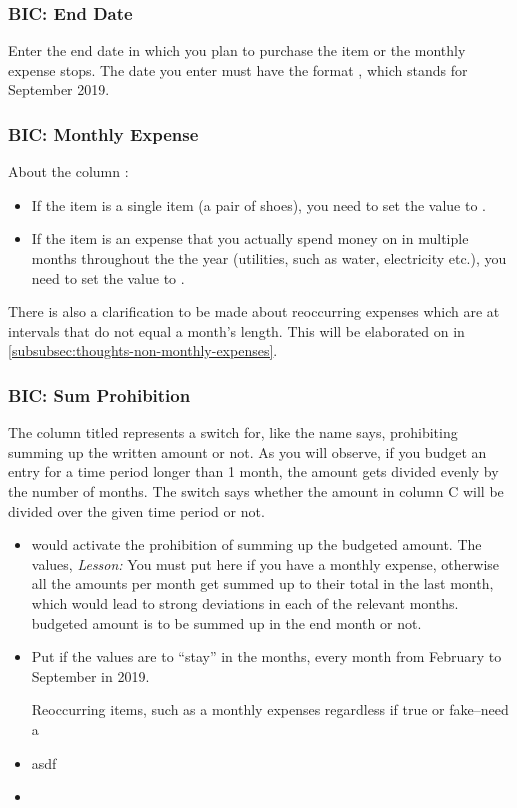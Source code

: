 \subsubsection{BIC: End Date}
\label{subsubsec:budgeting-item-column-end-date}

Enter the end date in which you plan to purchase the item or the monthly expense stops.
The date you enter must have the format , \eg {} which stands for September 2019.

\subsubsection{BIC: Monthly Expense}
\label{subsubsec:budgeting-item-column-monthly-expense}

About the column :
\begin{itemize}
	\item If the item is a single item (\eg a pair of shoes), you need to set the value to .
	\item If the item is an expense that you actually spend money on in multiple months throughout the the year (\eg utilities, such as water, electricity etc.), you need to set the value to .
\end{itemize}

There is also a clarification to be made about reoccurring expenses which are at intervals that do not equal a month's length.
This will be elaborated on in \autoref{subsubsec:thoughts-non-monthly-expenses}.

\subsubsection{BIC: Sum Prohibition}
\label{subsubsec:budgeting-item-column-sum-prohibition}

The column titled  represents a switch for, like the name says, prohibiting summing up the written amount or not.
As you will observe, if you budget an entry for a time period longer than 1 month, the amount gets divided evenly by the number of months.
The switch says whether the amount in column C will be divided over the given time period or not.
\begin{itemize}
	\item {} would activate the prohibition of summing up the budgeted amount.
	The values, 
	\emph{Lesson:} You must put  here if you have a monthly expense, otherwise all the amounts per month get summed up to their total in the last month, which would lead to strong deviations in each of the relevant months.
		budgeted amount is to be summed up in the end month or not.
	\item Put  if the values are to ``stay'' in the months, \ie every month from February to September in 2019.

	Reoccurring items, such as a monthly expenses regardless if true or fake--need a 
	\item asdf
	\item 
\end{itemize}


